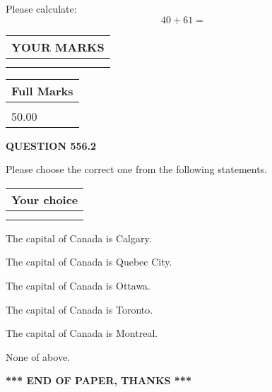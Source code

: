 \documentclass[12pt]{article}
\begin{document}
  
 
Please calculate:
\begin{equation}
40 +  %
61 = \nonumber
\end{equation}
 

 

 
  
\vspace{0.2in}
  
\noindent\begin{tabular}{|l|}
\hline
 YOUR MARKS  \\
\hline
 \\ 
 \\ 
\hline
\end{tabular}
\hspace{0.05in} \begin{tabular}{|l|}
\hline
 Full Marks  \\
\hline
 \\ 
50.00 \\
\hline
\end{tabular}
{\textbf{\Large{QUESTION
556.2 
}}}
  
  
Please choose the correct one from the following statements.
  
  
\noindent\hspace{3.0in} \begin{tabular}{|l|}
\hline
Your choice \\
\hline
 \\ 
 \\ 
\hline
\end{tabular}
  
  
 
 
The capital of Canada is Calgary.
 
 
The capital of Canada is Quebec City.
 
 
The capital of Canada is Ottawa.
 
 
The capital of Canada is Toronto.
 
 
The capital of Canada is Montreal.
 
 
 None of above.
 
 
   
   
 \vspace{0.2in}
 
   
   
   
   
\vspace{1.0in} 
{\textbf{\large{ *** END OF PAPER, THANKS *** }}} 
   
\end{document}
